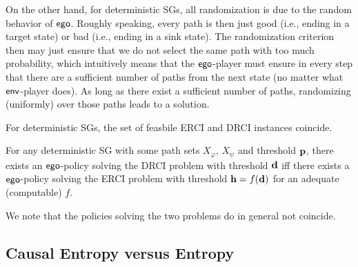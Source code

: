 On the other hand, for deterministic SGs, all randomization is due to the random behavior of $\mathsf{ego}$. Roughly speaking, every path is then just good (i.e., ending in a target state) or bad (i.e., ending in a sink state). The randomization criterion then may just ensure that we do not select the same path with too much probability, which intuitively means that the $\mathsf{ego}$-player must ensure in every step that there are a sufficient number of paths from the next state (no matter what $\mathsf{env}$-player does). 
As long as there exist a sufficient number of paths, randomizing (uniformly) over those paths leads to a solution.

	For deterministic SGs, the set of feasbile ERCI and DRCI instances coincide.
\begin{theorem}
For any deterministic SG with some path sets $X_\varphi$, $X_\psi$ and threshold $\mathbf{p}$, 
there exists an $\mathsf{ego}$-policy solving the DRCI problem with threshold $\mathbf{d}$ iff there exists a $\mathsf{ego}$-policy solving the ERCI problem with threshold $\mathbf{h} = f(\mathbf{d})$ for an adequate (computable) $f$.
\end{theorem}
We note that the policies solving the two problems do in general not coincide. 

\subsection{Causal Entropy versus Entropy}


